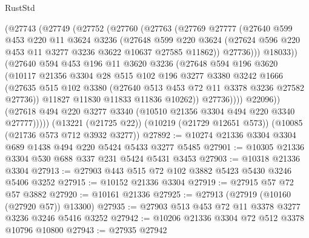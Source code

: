 \begin{lexlean}{RustStd}
\begin{coremodule}
                (@27743
                  (@27749
                    (@27752
                      (@27760
                        (@27763
                          (@27769
                            @27777
                            (@27640
                              @599
                              @453
                              @220
                              @11
                              @3624
                              @3236
                              (@27648
                                @599
                                @220
                                @3624
                                (@27624 @596 @220 @453 @11 @3277 @3236 @3622 @10637 @27585 @11862))
                              @27736)))
                        @18033))
                    (@27640
                      @594
                      @453
                      @196
                      @11
                      @3620
                      @3236
                      (@27648
                        @594
                        @196
                        @3620
                        (@10117
                          @21356
                          @3304
                          @28
                          @515
                          @102
                          @196
                          @3277
                          @3380
                          @3242
                          @1666
                          (@27635
                            @515
                            @102
                            @3380
                            (@27640 @513 @453 @72 @11 @3378 @3236 @27582 @27736))
                          @11827
                          @11830
                          @11833
                          @11836
                          @10262))
                      @27736))))
              @22096))
          (@27618 @494 @220 @3277 @3340 (@10510 @21356 @3304 @494 @220 @3340 @27777)))))
    (@13221 (@21725 @22))
    (@10219 (@21729 @12651 @573))
    (@10085 (@21736 @573 @712 @3932 @3277))
@27892 := @10274 @21336 @3304 @3304 @689 @1438 @494 @220 @5424 @5433 @3277 @5485
@27901 := @10305 @21336 @3304 @530 @688 @337 @231 @5424 @5431 @3453
@27903 := @10318 @21336 @3304
@27913 := @27903 @443 @515 @72 @102 @3882 @5423 @5430 @3246 @5406 @3252
@27915 := @10152 @21336 @3304
@27919 := @27915 @57 @72 @57 @3882
@27920 := @10161 @21336
@27925 := @27913 (@27919 (@10160 (@27920 @57)) @13300)
@27935 := @27903 @513 @453 @72 @11 @3378 @3277 @3236 @3246 @5416 @3252
@27942 := @10206 @21336 @3304 @72 @512 @3378 @10796 @10800
@27943 := @27935 @27942

\end{coremodule}
\end{lexlean}
